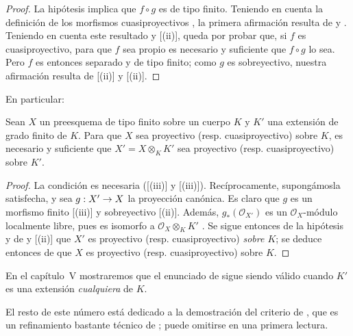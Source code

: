 \documentclass[oneside,10pt]{amsart}
\makeatletter
\newcommand{\ega@arrow}[2]{\mathchoice{#1}{#2}{#2}{#2}}
\renewcommand{\to}{\ega@arrow{\longrightarrow}{\rightarrow}}
\let\EGAOriginalLabel\label
\renewcommand{\label}[1]{\phantomsection\EGAOriginalLabel{#1}}
\makeatother
\begin{document}
\begin{proof}
La hipótesis implica que $f\circ g$ es de tipo finito.
Teniendo en cuenta la definición de los morfismos cuasiproyectivos , la primera afirmación resulta de  y .
Teniendo en cuenta este resultado y [(ii)], queda por probar que, si $f$ es cuasiproyectivo, para que $f$ sea propio es necesario y suficiente que $f\circ g$ lo sea.
Pero $f$ es entonces separado  y de tipo finito;
como $g$ es sobreyectivo, nuestra afirmación resulta de [(ii)] y [(ii)].
\end{proof}

En particular:

\begin{corollary}[6.6.5]
\label{II.6.6.5-fr}
Sean $X$ un preesquema de tipo finito sobre un cuerpo $K$ y $K'$ una extensión de grado finito de $K$.
Para que $X$ sea proyectivo \textup{(resp.} cuasiproyectivo\textup{)} sobre $K$, es necesario y suficiente que $X'=X\otimes_K K'$ sea proyectivo \textup{(resp.} cuasiproyectivo\textup{)} sobre $K'$.
\end{corollary}

\begin{proof}
La condición es necesaria ([(iii)] y [(iii)]).
Recíprocamente, supongámosla satisfecha, y sea $g:X'\to X$ la proyección canónica.
Es claro que $g$ es un morfismo finito [(iii)] y sobreyectivo [(ii)].
Además, $g_*(\mathcal{O}_{X'})$ es un $\mathcal{O}_X$-módulo localmente libre, pues es isomorfo a $\mathcal{O}_X\otimes_K K'$ .
Se sigue entonces de la hipótesis y de  y [(ii)] que $X'$ es proyectivo (resp. cuasiproyectivo) \emph{sobre $K$};
se deduce entonces de  que $X$ es proyectivo (resp. cuasiproyectivo) sobre $K$.
\end{proof}

En el capítulo~V mostraremos que el enunciado de  sigue siendo válido cuando $K'$ es una extensión \emph{cualquiera} de $K$.

El resto de este número está dedicado a la demostración del criterio de , que es un refinamiento bastante técnico de ;
puede omitirse en una primera lectura.
\end{document}
